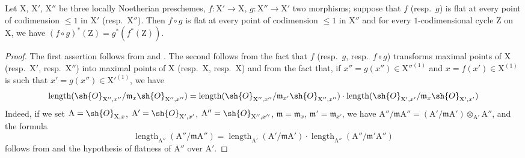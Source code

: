 \begin{proposition}[21.10.8]
\label{IV.21.10.8}
Let $\mathrm{X}$, $\mathrm{X}'$, $\mathrm{X}''$ be three locally Noetherian preschemes, $f:\mathrm{X}'\to\mathrm{X}$, $g:\mathrm{X}''\to\mathrm{X}'$ two morphisms; suppose that $f$ (resp.\ $g$) is flat at every point of codimension $\leq 1$ in $\mathrm{X}'$ (resp.\ $\mathrm{X}''$).
Then $f\circ g$ is flat at every point of codimension $\leq 1$ in $\mathrm{X}''$ and for every $1$-codimensional cycle $\mathrm{Z}$ on $\mathrm{X}$, we have $(f\circ g)^*(\mathrm{Z})=g^*(f^*(\mathrm{Z}))$.
\end{proposition}

\begin{proof}
The first assertion follows from  and .
The second follows from the fact that $f$ (resp.\ $g$, resp.\ $f\circ g$) transforms maximal points of $\mathrm{X}$ (resp.\ $\mathrm{X}'$, resp.\ $\mathrm{X}''$) into maximal points of $\mathrm{X}$ (resp.\ $\mathrm{X}$, resp.\ $\mathrm{X}$) and from the fact that, if $x''=g(x'')\in\mathrm{X}''^{(1)}$ and $x=f(x')\in\mathrm{X}^{(1)}$ is such that $x'=g(x'')\in\mathrm{X}'^{(1)}$, we have
\[
  \operatorname{length}(\sh{O}_{\mathrm{X}'',x''}/\mathfrak{m}_x\sh{O}_{\mathrm{X}'',x''})=\operatorname{length}(\sh{O}_{\mathrm{X}'',x''}/\mathfrak{m}_{x'}\sh{O}_{\mathrm{X}'',x''})\cdot\operatorname{length}(\sh{O}_{\mathrm{X}',x'}/\mathfrak{m}_x\sh{O}_{\mathrm{X}',x'})
\]
Indeed, if we set $\mathrm{A}=\sh{O}_{\mathrm{X},x}$, $\mathrm{A}'=\sh{O}_{\mathrm{X}',x'}$, $\mathrm{A}''=\sh{O}_{\mathrm{X}'',x''}$, $\mathfrak{m}=\mathfrak{m}_x$, $\mathfrak{m}'=\mathfrak{m}_{x'}$, we have $\mathrm{A}''/\mathfrak{m}\mathrm{A}''=(\mathrm{A}'/\mathfrak{m}\mathrm{A}')\otimes_{\mathrm{A}'}\mathrm{A}''$, and the formula
\[
  \operatorname{length}_{\mathrm{A}''}(\mathrm{A}''/\mathfrak{m}\mathrm{A}'')=\operatorname{length}_{\mathrm{A}'}(\mathrm{A}'/\mathfrak{m}\mathrm{A}')\cdot\operatorname{length}_{\mathrm{A}''}(\mathrm{A}''/\mathfrak{m}'\mathrm{A}'')
\]
follows from  and the hypothesis of flatness of $\mathrm{A}''$ over $\mathrm{A}'$.
\end{proof}

